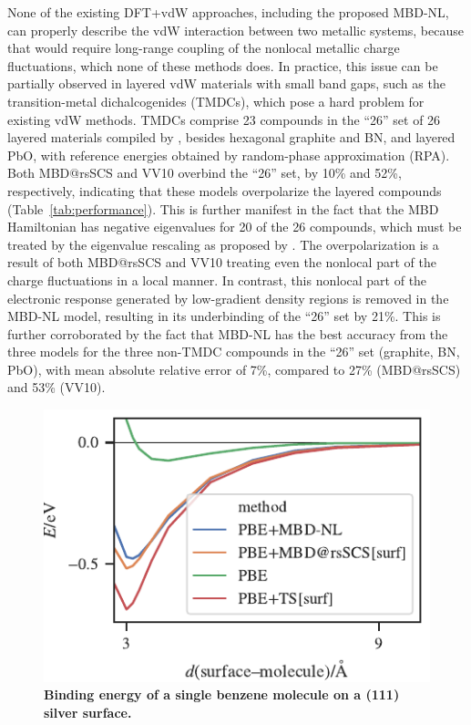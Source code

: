 None of the existing DFT+vdW approaches, including the proposed MBD-NL, can properly describe the vdW interaction between two metallic systems, because that would require long-range coupling of the nonlocal metallic charge fluctuations, which none of these methods does.
In practice, this issue can be partially observed in layered vdW materials with small band gaps, such as the transition-metal dichalcogenides (TMDCs), which pose a hard problem for existing vdW methods.
TMDCs comprise 23 compounds in the ``26'' set of 26 layered materials compiled by \citet{BjorkmanPRL12}, besides hexagonal graphite and BN, and layered PbO, with reference energies obtained by random-phase approximation (RPA).
Both MBD@rsSCS and VV10 overbind the ``26'' set, by 10\% and 52\%, respectively, indicating that these models overpolarize the layered compounds (Table~\ref{tab:performance}).
This is further manifest in the fact that the MBD Hamiltonian has negative eigenvalues for 20 of the 26 compounds, which must be treated by the eigenvalue rescaling as proposed by \citet{GouldJCTC16a}.
The overpolarization is a result of both MBD@rsSCS and VV10 treating even the nonlocal part of the charge fluctuations in a local manner.
In contrast, this nonlocal part of the electronic response generated by low-gradient density regions is removed in the MBD-NL model, resulting in its underbinding of the ``26'' set by 21\%.
This is further corroborated by the fact that MBD-NL has the best accuracy from the three models for the three non-TMDC compounds in the ``26'' set (graphite, BN, PbO), with mean absolute relative error of 7\%, compared to 27\% (MBD@rsSCS) and 53\% (VV10).

\begin{figure}[t!]
\centering
\includegraphics[width=\linewidth]{../media/surface.pdf}
\caption{\textbf{Binding energy of a single benzene molecule on a (111) silver surface.}
}\label{fig:silver-benzene}
\end{figure}

